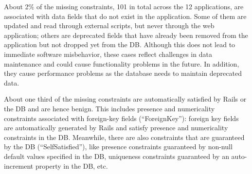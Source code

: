 About 2\% of the missing constraints, 101 in total across the 12 applications, are associated with data fields that do not exist in the application.
Some of them are updated and read through 
external scripts, but never through the web application; 
others are deprecated fields that have already been removed
from the application but not dropped yet from the DB. 
Although this does not lead to immediate software misbehavior, 
these cases reflect challenges in
data maintenance and could cause functionality problems in the future. In addition,
they cause performance problems as the database needs to maintain deprecated data.

About one third of the missing constraints are automatically satisfied by Rails or the DB and are hence benign. This includes presence and numericality constraints associated with foreign-key fields (``ForeignKey''): 
foreign key fields are automatically generated
by Rails and satisfy presence
and numericality constraints in the DB. Meanwhile, there are also constraints that are guaranteed by the DB (``SelfSatisfied''), like presence constraints guaranteed by non-null default values specified in the DB, uniqueness constraints guaranteed by an auto-increment property in the DB, etc.

\begin{table}
\centering
\caption{\# Constraints in DB but not in Application} 
\setlength{\tabcolsep}{2pt}  
\label{table:dbpresentmodelmissingbreakdown}
\end{table}

